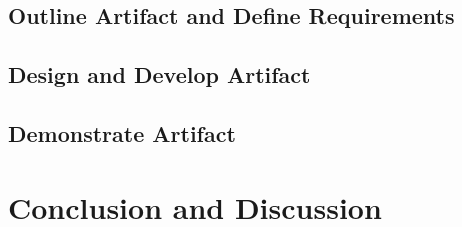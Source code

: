 \documentclass[12pt,
               a4,
               twoside,
               openright]{book} %
\begin{document}
    
    
    \section{Outline Artifact and Define Requirements}
    \label{sec:outline}
    
    \section{Design and Develop Artifact}
    \label{sec:design}
    
    \section{Demonstrate Artifact}
    \label{sec:demo}
    
    \chapter{Conclusion and Discussion}
    
    
    

    \backmatter


%    
%    

%    
%    


    
    

\end{document}
